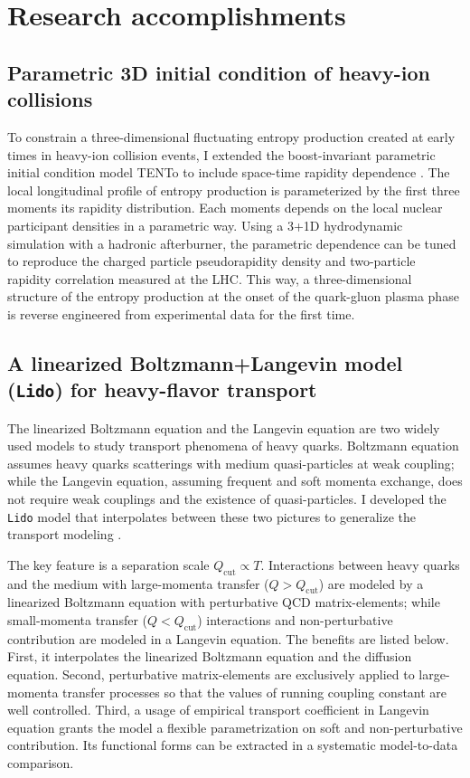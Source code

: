 \documentclass[12pt,a4paper]{revtex4-1}
\begin{document}
\section*{Research accomplishments}
\subsection*{Parametric 3D initial condition of heavy-ion collisions}
To constrain a three-dimensional fluctuating entropy production created at early times in heavy-ion collision events, I extended the boost-invariant parametric initial condition model TENTo to include space-time rapidity dependence \cite{Ke:2016jrd}. 
The local longitudinal profile of entropy production is parameterized by the first three moments its rapidity distribution. 
Each moments depends on the local nuclear participant densities in a parametric way. 
Using a 3+1D hydrodynamic simulation with a hadronic afterburner, the parametric dependence can be tuned to reproduce the charged particle pseudorapidity density and two-particle rapidity correlation measured at the LHC. 
This way, a three-dimensional structure of the entropy production at the onset of the quark-gluon plasma phase is reverse engineered from experimental data for the first time.   


\subsection*{A linearized Boltzmann+Langevin model ({\tt Lido}) for heavy-flavor transport}
The linearized Boltzmann equation and the Langevin equation are two widely  used models to study transport phenomena of heavy quarks.
Boltzmann equation assumes heavy quarks scatterings with medium quasi-particles at weak coupling; while the Langevin equation, assuming frequent and soft momenta exchange, does not require weak couplings and the existence of quasi-particles.
I developed the {\tt Lido} model that interpolates between these two pictures to generalize the transport modeling \cite{Ke:2018tsh, Ke:2018jem}.

The key feature is a separation scale $Q_{\textrm{cut}}\propto T$. Interactions between heavy quarks and the medium with large-momenta transfer ($Q > Q_{\textrm{cut}}$) are modeled by a linearized Boltzmann equation with perturbative QCD matrix-elements; while small-momenta transfer ($Q < Q_{\textrm{cut}}$) interactions and non-perturbative contribution are modeled in a Langevin equation. 
The benefits are listed below. First, it interpolates the linearized Boltzmann equation and the diffusion equation. 
Second, perturbative matrix-elements are exclusively applied to large-momenta transfer processes so that the values of running coupling constant  are well controlled. 
Third, a usage of empirical transport coefficient in Langevin equation grants the model a flexible parametrization on soft and non-perturbative contribution. 
Its functional forms can be extracted in a systematic model-to-data comparison.
\end{document}
